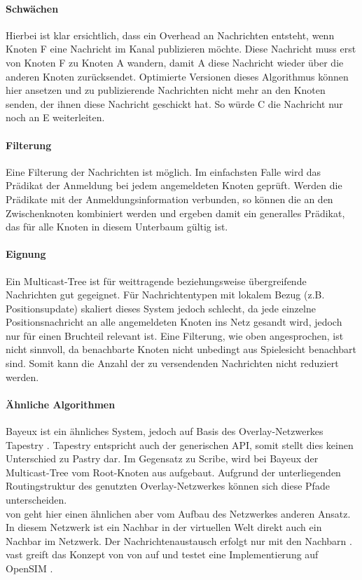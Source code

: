 \paragraph*{Schwächen}
Hierbei ist klar ersichtlich, dass ein Overhead an Nachrichten entsteht, wenn Knoten F eine Nachricht im Kanal publizieren möchte. Diese Nachricht muss erst von Knoten F zu Knoten A wandern, damit A diese Nachricht wieder über die anderen Knoten zurücksendet. Optimierte Versionen dieses Algorithmus können hier ansetzen und zu publizierende Nachrichten nicht mehr an den Knoten senden, der ihnen diese Nachricht geschickt hat. So würde C die Nachricht nur noch an E weiterleiten.

\paragraph*{Filterung}
Eine Filterung der Nachrichten ist möglich. Im einfachsten Falle wird das Prädikat der Anmeldung bei jedem angemeldeten Knoten geprüft. Werden die Prädikate mit der Anmeldungsinformation verbunden, so können die an den Zwischenknoten kombiniert werden und ergeben damit ein generalles Prädikat, das für alle Knoten in diesem Unterbaum gültig ist.

\paragraph*{Eignung}
Ein Multicast-Tree ist für weittragende beziehungsweise übergreifende Nachrichten gut gegeignet. Für Nachrichtentypen mit lokalem Bezug (z.B. Positionsupdate) skaliert dieses System jedoch schlecht, da jede einzelne Positionsnachricht an alle angemeldeten Knoten ins Netz gesandt wird, jedoch nur für einen Bruchteil relevant ist. Eine Filterung, wie oben angesprochen, ist nicht sinnvoll, da benachbarte Knoten nicht unbedingt aus Spielesicht benachbart sind. Somit kann die Anzahl der zu versendenden Nachrichten nicht reduziert werden.

\paragraph*{Ähnliche Algorithmen}
Bayeux \cite{Zhuang2001} ist ein ähnliches System, jedoch auf Basis des Overlay-Netzwerkes Tapestry \cite{Zhao2004Tapestry}. Tapestry entspricht auch der generischen API, somit stellt dies keinen Unterschied zu Pastry dar. Im Gegensatz zu Scribe, wird bei Bayeux der Multicast-Tree vom Root-Knoten aus aufgebaut. Aufgrund der unterliegenden Routingstruktur des genutzten Overlay-Netzwerkes können sich diese Pfade unterscheiden.\\
\ac{von} geht hier einen ähnlichen aber vom Aufbau des Netzwerkes anderen Ansatz. In diesem Netzwerk ist ein Nachbar in der virtuellen Welt direkt auch ein Nachbar im Netzwerk. Der Nachrichtenaustausch erfolgt nur mit den Nachbarn \cite{Hu2006VON}. \ac{vast} \cite{Backhaus2007Voronoibased} greift das Konzept von \ac{von} auf und testet eine Implementierung auf OpenSIM \cite{Baumgart2007OverSim}.




